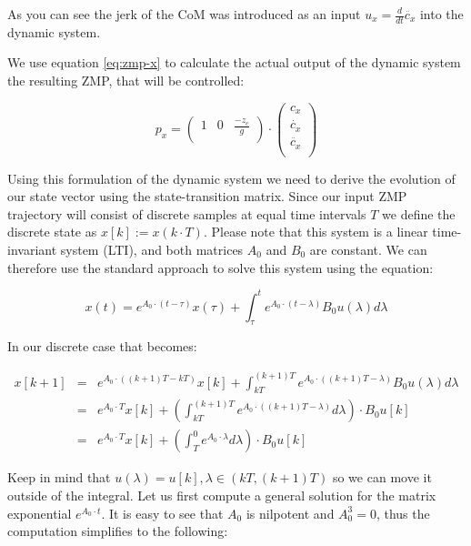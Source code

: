 \documentclass[english,ngerman]{KITreprt}
\begin{document}
As you can see the jerk of the CoM was introduced as an input
$u_x = \frac{d}{dt} \ddot{c_x}$ into the dynamic system.

We use equation \ref{eq:zmp-x} to calculate the actual output of the
dynamic system the resulting ZMP, that will be controlled:

\begin{equation} \label{eq:zmp-x-output}
p_x =
\left(\begin{array}{ccc}
1 & 0 & \frac{-z_c}{g} \\
\end{array}\right)
\cdot
\left(\begin{array}{c}
c_x \\
\dot{c_x} \\
\ddot{c_x} \\
\end{array}\right)
\end{equation}

Using this formulation of the dynamic system we need to derive the
evolution of our state vector using the state-transition matrix. Since
our input ZMP trajectory will consist of discrete samples at equal time
intervals $T$ we define the discrete state as $x[k] := x(k \cdot T)$.
Please note that this system is a linear time-invariant system (LTI),
and both matrices $A_0$ and $B_0$ are constant. We can therefore use the
standard approach to solve this system using the equation:

\begin{equation}
x(t) = e^{A_0 \cdot (t - \tau)} x(\tau) + \int^t_\tau e^{A_0 \cdot (t - \lambda)} B_0 u(\lambda) d\lambda
\end{equation}

In our discrete case that becomes:

\begin{eqnarray} \label{eq:state-transition-discrete}
x[k+1] & = & e^{A_0 \cdot ((k+1)T - kT)} x[k] + \int^{(k+1)T}_{kT} e^{A_0 \cdot ((k+1)T - \lambda)} B_0 u(\lambda) d\lambda \\
       & = & e^{A_0 \cdot T} x[k] + \left(\int^{(k+1)T}_{kT} e^{A_0 \cdot ((k+1)T - \lambda)} d\lambda \right) \cdot B_0 u[k]\\
       & = & e^{A_0 \cdot T} x[k] + \left(\int^{0}_{T} e^{A_0 \cdot \lambda} d\lambda\right) \cdot B_0 u[k]
\end{eqnarray}

Keep in mind that $u(\lambda) = u[k], \lambda \in (kT, (k+1)T)$ so we
can move it outside of the integral. Let us first compute a general
solution for the matrix exponential $e^{A_0 \cdot t}$. It is easy to see
that $A_0$ is nilpotent and $A_0^3 = 0$, thus the computation simplifies
to the following:
\end{document}
